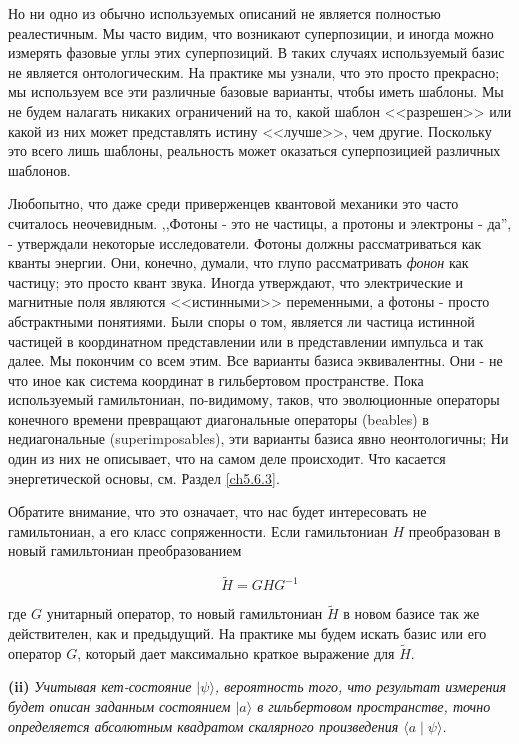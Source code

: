 \documentclass[main.tex]{subfiles}
\begin{document}
Но ни одно из обычно используемых описаний не является полностью реалестичным. Мы часто видим, что возникают суперпозиции, и иногда можно измерять фазовые углы этих суперпозиций. В таких случаях используемый базис не является онтологическим. На практике мы узнали, что это просто прекрасно; мы используем все эти различные базовые варианты, чтобы иметь шаблоны. Мы не будем налагать никаких ограничений на то, какой шаблон <<разрешен>> или какой из них может представлять истину <<лучше>>, чем другие. Поскольку это всего лишь шаблоны, реальность может оказаться суперпозицией различных шаблонов.

Любопытно, что даже среди приверженцев квантовой механики это часто считалось неочевидным. ,,Фотоны - это не частицы, а протоны и электроны - да'', - утверждали некоторые исследователи. Фотоны должны рассматриваться как кванты энергии. Они, конечно, думали, что глупо рассматривать \textit{фонон} как частицу; это просто квант звука. Иногда утверждают, что электрические и магнитные поля являются <<истинными>> переменными, а фотоны - просто абстрактными понятиями. Были споры о том, является ли частица истинной частицей в координатном представлении или в представлении импульса и так далее. Мы покончим со всем этим. Все варианты базиса эквивалентны. Они - не что иное как система координат в гильбертовом пространстве. Пока используемый гамильтониан, по-видимому, таков, что эволюционные операторы конечного времени превращают диагональные операторы (beables) в недиагональные (superimposables), эти варианты базиса явно неонтологичны; Ни один из них не описывает, что на самом деле происходит. Что касается энергетической основы, см. Раздел \ref{ch5.6.3}.

Обратите внимание, что это означает, что нас будет интересовать не гамильтониан, а его класс сопряженности. Если гамильтониан $H$ преобразован в новый гамильтониан преобразованием

\begin{equation}\label{5.7}
	\tilde H = GHG^{-1}
\end{equation}

           
где $G$ унитарный оператор, то новый гамильтониан $\tilde H$ в новом базисе так же действителен, как и предыдущий. На практике мы будем искать базис или его оператор $G$, который дает максимально краткое выражение для $\tilde H$.

\textbf{(ii)} {\it Учитывая кет-состояние $|\psi\rangle$, вероятность того, что результат измерения будет описан заданным состоянием $|a\rangle$ в гильбертовом пространстве, точно определяется абсолютным квадратом скалярного произведения $\langle a\mid \psi\rangle$.}
\end{document}
